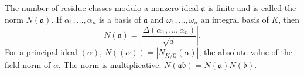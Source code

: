 The number of residue classes modulo a nonzero ideal $\mathfrak{a}$ is finite and is called the norm $N(\mathfrak{a})$. If $\alpha_1,\ldots,\alpha_n$ is a basis of $\mathfrak{a}$ and $\omega_1,\ldots,\omega_n$ an integral basis of $K$, then
$$N(\mathfrak{a}) = \left|\frac{\Delta(\alpha_1,\ldots,\alpha_n)}{\sqrt{d}}\right|.$$
For a principal ideal $(\alpha)$, $N((\alpha)) = |N_{K/\mathbb{Q}}(\alpha)|$, the absolute value of the field norm of $\alpha$. The norm is multiplicative: $N(\mathfrak{a}\mathfrak{b}) = N(\mathfrak{a})N(\mathfrak{b})$.
